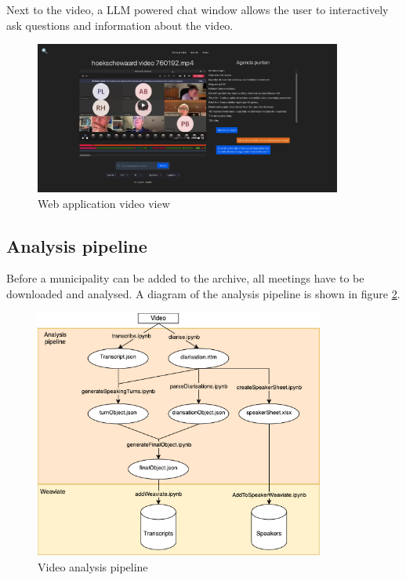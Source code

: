 \documentclass[twoside]{uva-inf-bachelor-thesis}
\begin{document}
Next to the video, a LLM powered chat window allows the user to interactively ask questions and information about the video.
\begin{figure}
    \centering
    \includegraphics[width=0.9\textwidth]{images/frontend.png}
    \caption{Web application video view}
    \label{fig:frontendVid}
\end{figure}




\subsection{Analysis pipeline}
Before a municipality can be added to the archive, all meetings have to be downloaded and analysed. A diagram of the analysis pipeline is shown in figure \ref{fig:pipeline}.

\begin{figure}
    \centering
    \includegraphics[width=0.85\textwidth]{images/pipeline.png}
    \caption{Video analysis pipeline}
    \label{fig:pipeline}
\end{figure}
\end{document}
